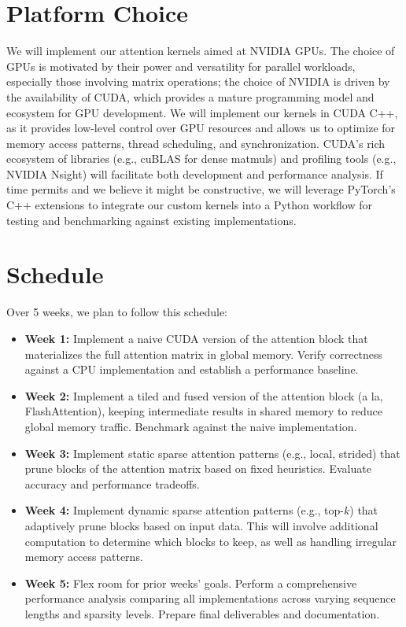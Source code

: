 \documentclass[11pt]{article}
\begin{document}
\section*{Platform Choice}
We will implement our attention kernels aimed at NVIDIA GPUs. The choice of GPUs is motivated by their power and versatility for parallel workloads, especially those involving matrix operations; the choice of NVIDIA is driven by the availability of CUDA, which provides a mature programming model and ecosystem for GPU development. We will implement our kernels in CUDA C++, as it provides low-level control over GPU resources and allows us to optimize for memory access patterns, thread scheduling, and synchronization. CUDA's rich ecosystem of libraries (e.g., cuBLAS for dense matmuls) and profiling tools (e.g., NVIDIA Nsight) will facilitate both development and performance analysis. If time permits and we believe it might be constructive, we will leverage PyTorch's C++ extensions to integrate our custom kernels into a Python workflow for testing and benchmarking against existing implementations.


\section*{Schedule}
Over 5 weeks, we plan to follow this schedule:
\begin{itemize}
    \item \textbf{Week 1:} Implement a naive CUDA version of the attention block that materializes the full attention matrix in global memory. Verify correctness against a CPU implementation and establish a performance baseline.

    \item \textbf{Week 2:} Implement a tiled and fused version of the attention block (a la, FlashAttention), keeping intermediate results in shared memory to reduce global memory traffic. Benchmark against the naive implementation.

    \item \textbf{Week 3:} Implement static sparse attention patterns (e.g., local, strided) that prune blocks of the attention matrix based on fixed heuristics. Evaluate accuracy and performance tradeoffs.

    \item \textbf{Week 4:} Implement dynamic sparse attention patterns (e.g., top-$k$) that adaptively prune blocks based on input data. This will involve additional computation to determine which blocks to keep, as well as handling irregular memory access patterns.

    \item \textbf{Week 5:} Flex room for prior weeks' goals. Perform a comprehensive performance analysis comparing all implementations across varying sequence lengths and sparsity levels. Prepare final deliverables and documentation.
\end{itemize}
\end{document}

